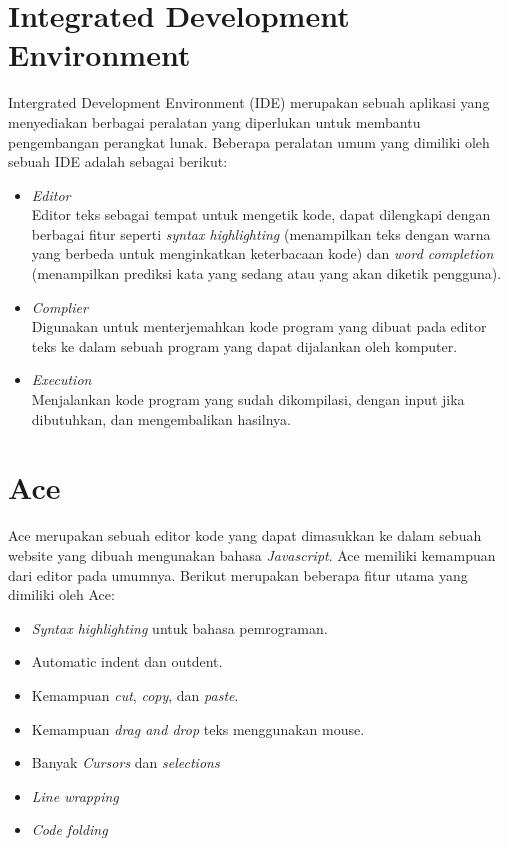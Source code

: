 \section{Integrated Development Environment}
\label{sec:2:ide}

Intergrated Development Environment (IDE) merupakan sebuah aplikasi yang menyediakan berbagai peralatan yang diperlukan untuk membantu pengembangan perangkat lunak. Beberapa peralatan umum yang dimiliki oleh sebuah IDE adalah sebagai berikut:

\begin{itemize}
	\item \textit{Editor} \\
	      Editor teks sebagai tempat untuk mengetik kode, dapat dilengkapi dengan berbagai fitur seperti \textit{syntax highlighting} (menampilkan teks dengan warna yang berbeda untuk menginkatkan keterbacaan kode) dan \textit{word completion} (menampilkan prediksi kata yang sedang atau yang akan diketik pengguna).
	\item \textit{Complier} \\
	      Digunakan untuk menterjemahkan kode program yang dibuat pada editor teks ke dalam sebuah program yang dapat dijalankan oleh komputer.
	\item \textit{Execution} \\
	      Menjalankan kode program yang sudah dikompilasi, dengan input jika dibutuhkan, dan mengembalikan hasilnya.
\end{itemize}

\section{Ace}
\label{sec:2:ace}

Ace merupakan sebuah editor kode yang dapat dimasukkan ke dalam sebuah website yang dibuah mengunakan bahasa \textit{Javascript}. Ace memiliki kemampuan dari editor pada umumnya. Berikut merupakan beberapa fitur utama yang dimiliki oleh Ace:

\begin{itemize}
	\item \textit{Syntax highlighting} untuk bahasa pemrograman.
	\item Automatic indent dan  outdent.
	\item Kemampuan \textit{cut}, \textit{copy}, dan \textit{paste}.
	\item Kemampuan \textit{drag and drop} teks menggunakan mouse.
	\item Banyak \textit{Cursors} dan \textit{selections}
	\item \textit{Line wrapping}
	\item \textit{Code folding}
\end{itemize}

